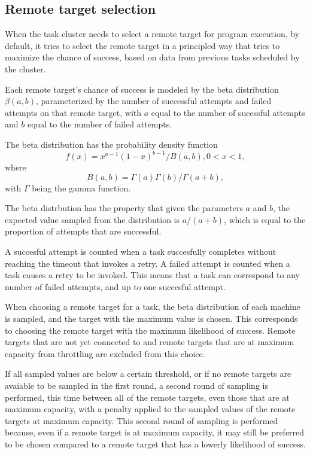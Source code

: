 \documentclass[twoside]{report}
\newcommand{\todoi}[1]{\todo[inline, color=blue!20]{TODO: {#1}}}
\begin{document}
\subsection{Remote target selection}
When the task cluster needs to select a remote target for program execution, by default, it tries to select the remote target in a principled way that tries to maximize the chance of success, based on data from previous tasks scheduled by the cluster.

Each remote target's chance of success is modeled by the beta distribution $\beta(a, b)$, parameterized by the number of successful attempts and failed attempts on that remote target, with $a$ equal to the number of sucessful attempts and $b$ equal to the number of failed attempts.

The beta distribution has the probability density function
$$ f(x) = x^{a-1}(1-x)^{b-1} / B(a, b), 0 < x < 1,$$
where
$$ B(a, b) = \Gamma(a)\Gamma(b) / \Gamma(a+b), $$
with $\Gamma$ being the gamma function.

The beta distrbution has the property that given the parameters $a$ and $b$, the expected value sampled from the distribution is $a/(a+b)$, which is equal to the proportion of attempts that are successful.

A succesful attempt is counted when a task succesfully completes without reaching the timeout that invokes a retry.
A failed attempt is counted when a task causes a retry to be invoked.
This means that a task can correspond to any number of failed attempts, and up to one succesful attempt.

When choosing a remote target for a task, the beta distribution of each machine is sampled, and the target with the maximum value is chosen.
This corresponds to choosing the remote target with the maximum likelihood of success.
Remote targets that are not yet connected to and remote targets that are at maximum capacity from throttling are excluded from this choice.

If all sampled values are below a certain threshold, or if no remote targets are avaiable to be sampled in the first round, a second round of sampling is performed, this time between all of the remote targets, even those that are at maximum capacity, with a penalty applied to the sampled values of the remote targets at maximum capacity.
This second round of sampling is performed because, even if a remote target is at maximum capacity, it may still be preferred to be chosen compared to a remote target that has a lowerly likelihood of success.
\end{document}
